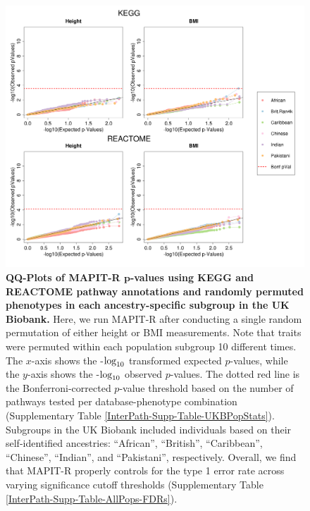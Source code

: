\documentclass[10pt]{article}
\def\log{{\rm log}}
\begin{document}
\begin{figure}[htbp]
\centering
\includegraphics[width = \textwidth]{Images/Supp/InterPath_Supp_Figure_perm1_QQPlots_AllPaths_vs2.png}
\caption{\textbf{QQ-Plots of MAPIT-R $\bm{p}$-values using KEGG and REACTOME pathway annotations and randomly permuted phenotypes in each ancestry-specific subgroup in the UK Biobank.} Here, we run MAPIT-R after conducting a single random permutation of either height or BMI measurements. Note that traits were permuted within each population subgroup 10 different times. The $x$-axis shows the -$\log_{10}$ transformed expected $p$-values, while the $y$-axis shows the -$\log_{10}$ observed $p$-values. The dotted red line is the Bonferroni-corrected $p$-value threshold based on the number of pathways tested per database-phenotype combination (Supplementary Table \ref{InterPath-Supp-Table-UKBPopStats}). Subgroups in the UK Biobank included individuals based on their self-identified ancestries: ``African'', ``British'', ``Caribbean'', ``Chinese'', ``Indian'', and ``Pakistani'', respectively. Overall, we find that MAPIT-R properly controls for the type 1 error rate across varying significance cutoff thresholds (Supplementary Table \ref{InterPath-Supp-Table-AllPops-FDRs}).}
\label{InterPath-Supp-Figure-perm1-QQPlots-AllPaths}
\end{figure}
\clearpage
\end{document}
